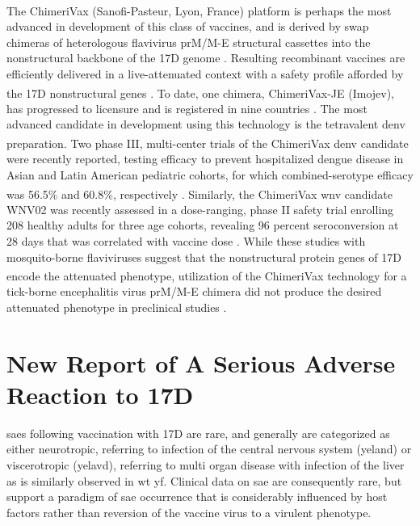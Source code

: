 The ChimeriVax\textsuperscript{\textregistered} (Sanofi-Pasteur, Lyon, France) platform is perhaps the most advanced in development of this class of vaccines, and is derived by swap chimeras of heterologous flavivirus prM/M-E structural cassettes into the nonstructural backbone of the 17D genome \parencite{Bray:1991ti}. Resulting recombinant vaccines are efficiently delivered in a live-attenuated context with a safety profile afforded by the 17D nonstructural genes \parencite{Guy:2011cq}. To date, one chimera, ChimeriVax-JE (Imojev\textsuperscript{\textregistered}), has progressed to licensure and is registered in nine countries \parencite{Appaiahgari:2010kr}. The most advanced candidate in development using this technology is the tetravalent \gls{denv} preparation. Two phase III, multi-center trials of the ChimeriVax\textsuperscript{\textregistered} \gls{denv} candidate were recently reported, testing efficacy to prevent hospitalized dengue disease in Asian and Latin American pediatric cohorts, for which combined-serotype efficacy was 56.5\% and 60.8\%, respectively \parencite{Capeding:2014fj,Villar:2015jpa}. Similarly, the ChimeriVax\textsuperscript{\textregistered} \gls{wnv} candidate WNV02 was recently assessed in a dose-ranging, phase II safety trial enrolling 208 healthy adults for three age cohorts, revealing 96 percent seroconversion at 28 days that was correlated with vaccine dose \parencite{Monath:2006ft, Biedenbender:2011ic}. While these studies with mosquito-borne flaviviruses suggest that the nonstructural protein genes of 17D encode the attenuated phenotype, utilization of the ChimeriVax\textsuperscript{\textregistered} technology for a tick-borne encephalitis virus prM/M-E chimera did not produce the desired attenuated phenotype in preclinical studies \parencite{Rumyantsev:2013cl}.

\section{New Report of A Serious Adverse Reaction to 17D}
\Glspl{sae} following vaccination with 17D are rare, and generally are categorized as either neurotropic, referring to infection of the central nervous system (\gls{yeland}) or viscerotropic (\gls{yelavd}), referring to multi organ disease with infection of the liver as is similarly observed in \gls{wt} \gls{yf}. Clinical data on \gls{sae} are consequently rare, but support a paradigm of \gls{sae} occurrence that is considerably influenced by host factors rather than reversion of the vaccine virus to a virulent phenotype.
	
